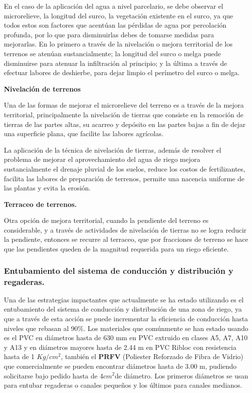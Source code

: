 En el caso de la aplicación del agua a nivel parcelario, se debe observar el
microrelieve, la longitud del surco, la vegetación existente en el surco, ya que todos estos
son factores que acentúan las pérdidas de agua por percolación profunda, por lo que para
disminuirlas debes de tomarse medidas para mejorarlas. En lo primero a través de la
nivelación o mejora territorial de los terrenos se atenúan sustancialmente; la longitud del
surco o melga puede disminuirse para atenuar la infiltración al principio; y la última a
través de efectuar labores de deshierbe, para dejar limpio el perímetro del surco o melga.

\textbf{Nivelación de terrenos}

Una de las formas de mejorar el microrelieve del terreno es a través de la mejora
territorial, principalmente la nivelación de tierras que consiste en la remoción de tierras
de las partes altas, su acarreo y depósito en las partes bajas a fin de dejar una
superficie plana, que facilite las labores agrícolas.

La aplicación de la técnica de nivelación de tierras, además de resolver el
problema de mejorar el aprovechamiento del agua de riego mejora sustancialmente el
drenaje pluvial de los suelos, reduce los costos de fertilizantes, facilita las labores de
preparación de terrenos, permite una nacencia uniforme de las plantas y evita la
erosión.

\textbf{Terraceo de terrenos.}

Otra opción de mejora territorial, cuando la pendiente del terreno es
considerable, y a través de actividades de nivelación de tierras no se logra reducir la
pendiente, entonces se recurre al terraceo, que por fracciones de terreno se hace que
las pendientes queden de la magnitud requerida para un riego eficiente.


\subsubsection{Entubamiento del sistema de conducción y distribución y regaderas.}
Una de las estrategias impactantes que actualmente se ha estado utilizando es el
entubamiento del sistema de conducción y distribución de una zona de riego, ya que a
través de esta acción se puede incrementar la eficiencia de conducción hasta niveles
que rebasan al 90\%. Los materiales que comúnmente se han estado usando es el PVC
en diámetros hasta de 630 mm en PVC extruido en clases A5, A7, A10 y A13 y en
diámetros mayores hasta de 2.44 m en PVC Ribloc con resistencia hasta de 1 $Kg/cm^2$,
también el \textbf{PRFV} (Poliester Reforzado de Fibra de Vidrio) que comercialmente se pueden
encontrar diámetros hasta de 3.00 m, pudiendo solicitarse bajo pedido hasta de 4$cm^2$de
diámetro. Los primeros diámetros se usan para entubar regaderas o canales pequeños
y los últimos para canales medianos.

